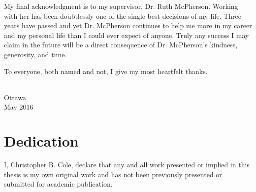 \documentclass[10pt,a4paper,oneside]{memoir} %
\begin{document}
My final acknowledgment is to my supervisor, Dr. Ruth McPherson. Working with her has been doubtlessly one of the single best decisions of my life. Three years have passed and yet Dr. McPherson continues to help me more in my career and my personal life than I could ever expect of anyone. Truly any success I may claim in the future will be a direct consequence of Dr. McPherson's kindness, generosity, and time.

To everyone, both named and not, I give my most heartfelt thanks. 


\begin{flushright}
\textsc{\theauthor}\\
Ottawa\\
May 2016
\end{flushright}

\cleartoverso %



\section*{Dedication}

I, Christopher B. Cole, declare that any and all work presented or implied in this thesis is my own original work and has not been previously presented or submitted for academic publication. 

\cleartoverso %


\end{document}
